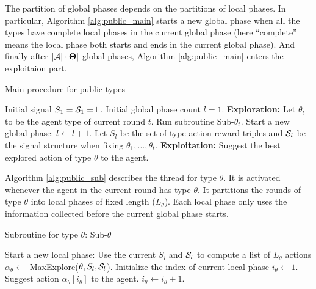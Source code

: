 The partition of global phases depends on the partitions of local phases. In particular, Algorithm \ref{alg:public_main} starts a new global phase when all the types have complete local phases in the current global phase (here ``complete'' means the local phase both starts and ends in the current global phase). And finally after $|\A| \cdot \varTheta|$ global phases, Algorithm \ref{alg:public_main}  enters the exploitaion part.
 \begin{algorithm}[H]
    \caption{Main procedure for public types }
    	\label{alg:public_main}
    \begin{algorithmic}[1]
    	\STATE Initial signal $S_1 = \S_1 = \perp$.
	\STATE Initial global phase count $l = 1$.
			\STATE \textbf{Exploration:}
			\STATE Let $\theta_t$ to be the agent type of current round $t$. Run subroutine Sub-$\theta_t$.
				\STATE Start a new global phase:
				\STATE $l \leftarrow l + 1$.
				\STATE Let $S_l$ be the set of type-action-reward triples and $\S_l$ be the signal structure when fixing $\theta_1,...,\theta_t$.
			\ENDIF
		\ELSE
			\STATE \textbf{Exploitation:} 
			\STATE Suggest the best explored action of type $\theta$ to the agent.
		\ENDIF
	\ENDFOR
     \end{algorithmic}
\end{algorithm}

Algorithm \ref{alg:public_sub} describes the thread for type $\theta$. It is activated whenever the agent in the current round has type $\theta$. It partitions the rounds of type $\theta$ into local phases of fixed length ($L_{\theta}$). Each local phase only uses the information collected before the current global phase starts.

 \begin{algorithm}[H]
    \caption{Subroutine for type $\theta$: Sub-$\theta$ }
    	\label{alg:public_sub}
    \begin{algorithmic}[1]
			\STATE Start a new local phase:
			\STATE Use the current $S_l$ and $\S_l$ to compute a list of $L_{\theta}$ actions $\alpha_{\theta} \leftarrow $ MaxExplore($\theta, S_l, \S_l$).
			\STATE Initialize the index of current local phase $i_{\theta} \leftarrow 1$.
		\ENDIF
		\STATE Suggest action $\alpha_{\theta} [i_{\theta}]$ to the agent.
		\STATE $i_{\theta} \leftarrow i_{\theta} + 1$.
	\ENDFOR
     \end{algorithmic}
\end{algorithm}


